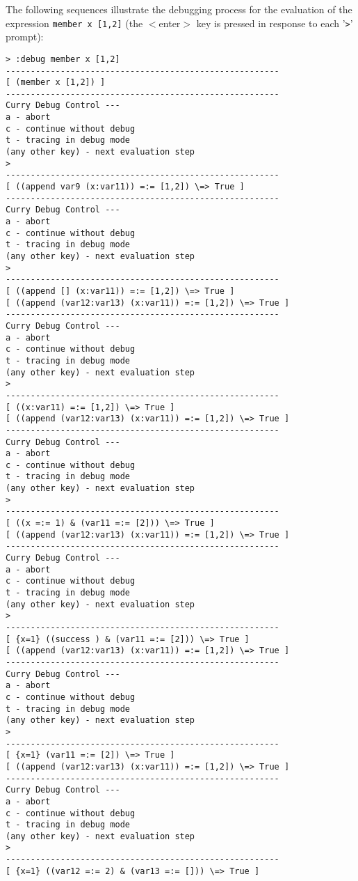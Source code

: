 \documentclass[titlepage,fleqn]{article}
\newcommand{\pr}[1]{\mbox{\tt #1}}   %
\newcommand{\prompt}{\pr{>}}
\begin{document}
The following sequences illustrate
the debugging process for the evaluation of the
expression \pr{member x [1,2]} (the $<$enter$>$ key is pressed in
response to each '\prompt' prompt):
{\small
\begin{verbatim}
> :debug member x [1,2]  
-------------------------------------------------------
[ (member x [1,2]) ]
-------------------------------------------------------
Curry Debug Control ---
a - abort
c - continue without debug
t - tracing in debug mode
(any other key) - next evaluation step
>  
-------------------------------------------------------
[ ((append var9 (x:var11)) =:= [1,2]) \=> True ]
-------------------------------------------------------
Curry Debug Control ---
a - abort
c - continue without debug
t - tracing in debug mode
(any other key) - next evaluation step
> 
-------------------------------------------------------
[ ((append [] (x:var11)) =:= [1,2]) \=> True ]
[ ((append (var12:var13) (x:var11)) =:= [1,2]) \=> True ]
-------------------------------------------------------
Curry Debug Control ---
a - abort
c - continue without debug
t - tracing in debug mode
(any other key) - next evaluation step
>
-------------------------------------------------------
[ ((x:var11) =:= [1,2]) \=> True ]
[ ((append (var12:var13) (x:var11)) =:= [1,2]) \=> True ]
-------------------------------------------------------
Curry Debug Control ---
a - abort
c - continue without debug
t - tracing in debug mode
(any other key) - next evaluation step
>
-------------------------------------------------------
[ ((x =:= 1) & (var11 =:= [2])) \=> True ]
[ ((append (var12:var13) (x:var11)) =:= [1,2]) \=> True ]
-------------------------------------------------------
Curry Debug Control ---
a - abort
c - continue without debug
t - tracing in debug mode
(any other key) - next evaluation step
>
-------------------------------------------------------
[ {x=1} ((success ) & (var11 =:= [2])) \=> True ]
[ ((append (var12:var13) (x:var11)) =:= [1,2]) \=> True ]
-------------------------------------------------------
Curry Debug Control ---
a - abort
c - continue without debug
t - tracing in debug mode
(any other key) - next evaluation step
>
-------------------------------------------------------
[ {x=1} (var11 =:= [2]) \=> True ]
[ ((append (var12:var13) (x:var11)) =:= [1,2]) \=> True ]
-------------------------------------------------------
Curry Debug Control ---
a - abort
c - continue without debug
t - tracing in debug mode
(any other key) - next evaluation step
>
-------------------------------------------------------
[ {x=1} ((var12 =:= 2) & (var13 =:= [])) \=> True ]

\end{verbatim}}
\end{document}
